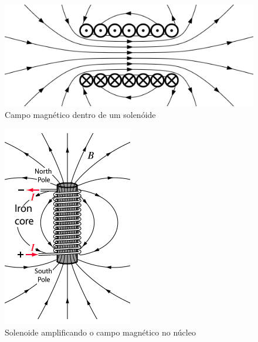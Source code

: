 \documentclass[
        12pt,                           %
        openright,                      %
        twoside,                        %
        a4paper,                        %
        english,                        %
        french,                         %
        spanish,                        %
        brazil                          %
        ]{abntex2}
\begin{document}
\begin{figure}[htp]
  \centering
  \includegraphics[width=0.5\columnwidth]{2560px-VFPt_Solenoid_correct2.svg.png}
  \caption{Campo magnético dentro de um solenóide}
  \label{fig:chap:embasamento:2}
\end{figure}

\begin{figure}[htp]
  \centering
  \includegraphics[width=0.2\columnwidth]{Elecmagnet.png}
  \caption{Solenoide amplificando o campo magnético no núcleo}
  \label{fig:chap:embasamento:3}
\end{figure}
\end{document}
